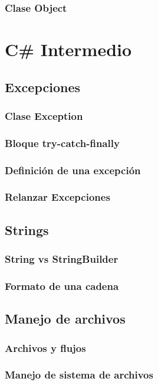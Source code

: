 \documentclass[12pt,a4paper]{report}
\begin{document}
{\section{Clase Object}

\part{C\# Intermedio}

\chapter{Excepciones}
\section{Clase Exception}
\section{Bloque try-catch-finally}
\section{Definición de una excepción}
\section{Relanzar Excepciones}

\chapter{Strings}
\section{String vs StringBuilder}
\section{Formato de una cadena}
	
\chapter{Manejo de archivos}
\section{Archivos y flujos}
\section{Manejo de sistema de archivos}
}
\end{document}
